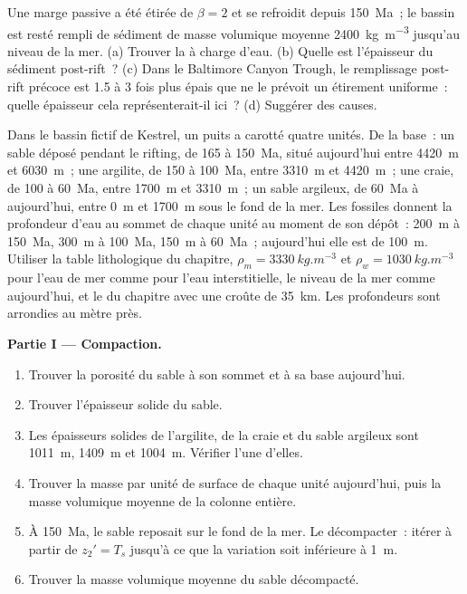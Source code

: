 \begin{exercise}[$\star\star\star$]\label{exo:b2:basins-compared:12}
Une marge passive a été étirée de $\beta = 2$ et se refroidit depuis \qty{150}{Ma}~; le
bassin est resté rempli de sédiment de masse volumique moyenne \qty{2400}{kg.m^{-3}} jusqu'au niveau de la mer.
(a) Trouver la  à charge d'eau. (b) Quelle est l'épaisseur du sédiment post-rift~?
(c) Dans le Baltimore Canyon Trough, le remplissage post-rift précoce est 1.5 à 3 fois plus épais que
ne le prévoit un étirement uniforme~: quelle épaisseur cela représenterait-il ici~? (d) Suggérer des causes.
\end{exercise}

\begin{problem}\label{pb:b2:basins-compared:1}
Dans le bassin fictif de Kestrel, un puits a carotté quatre unités. De la base~: un sable déposé pendant le
rifting, de 165 à \qty{150}{Ma}, situé aujourd'hui entre \qty{4420}{m} et \qty{6030}{m}~; une argilite, de 150
à \qty{100}{Ma}, entre \qty{3310}{m} et \qty{4420}{m}~; une craie, de 100 à \qty{60}{Ma}, entre
\qty{1700}{m} et \qty{3310}{m}~; un sable argileux, de \qty{60}{Ma} à aujourd'hui, entre \qty{0}{m} et
\qty{1700}{m} sous le fond de la mer. Les fossiles donnent la profondeur d'eau au sommet de chaque unité au moment de son
dépôt~: \qty{200}{m} à \qty{150}{Ma}, \qty{300}{m} à \qty{100}{Ma}, \qty{150}{m} à
\qty{60}{Ma}~; aujourd'hui elle est de \qty{100}{m}. Utiliser la table lithologique du chapitre, $\rho_m =
\qty{3330}{kg.m^{-3}}$ et $\rho_w = \qty{1030}{kg.m^{-3}}$ pour l'eau de mer comme pour l'eau interstitielle, le niveau de la mer
comme aujourd'hui, et le  du chapitre avec une croûte de \qty{35}{km}. Les profondeurs sont arrondies au
mètre près.

\noindent\textbf{Partie I --- Compaction.}
\begin{enumerate}
  \item Trouver la porosité du sable à son sommet et à sa base aujourd'hui.
  \item Trouver l'épaisseur solide du sable.
  \item Les épaisseurs solides de l'argilite, de la craie et du sable argileux sont \qty{1011}{m},
        \qty{1409}{m} et \qty{1004}{m}. Vérifier l'une d'elles.
  \item Trouver la masse par unité de surface de chaque unité aujourd'hui, puis la masse volumique moyenne de
        la colonne entière.
  \item À \qty{150}{Ma}, le sable reposait sur le fond de la mer. Le décompacter~: itérer à partir de $z_2' =
        T_s$ jusqu'à ce que la variation soit inférieure à \qty{1}{m}.
  \item Trouver la masse volumique moyenne du sable décompacté.
\end{enumerate}


\end{problem}

